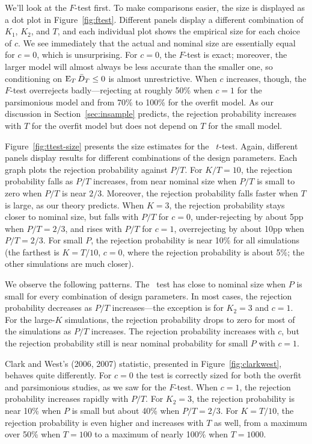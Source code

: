 \documentclass[11pt]{article}
\begin{document}
We'll look at the $F$-test first.  To make comparisons easier, the size
is displayed as a dot plot in Figure~\ref{fig:ftest}.  Different
panels display a different combination of $K_1$, $K_2$, and $T$, and
each individual plot shows the empirical size for each choice of $c$.
We see immediately that the actual and nominal size are essentially
equal for $c = 0$, which is unsurprising.  For $c = 0$, the $F$-test is
exact; moreover, the larger model will almost always be less accurate
than the smaller one, so conditioning on $\operatorname{E}_T \bar{D}_{T} \leq 0$ is
almost unrestrictive.  When $c$ increases, though, the $F$-test
overrejects badly---rejecting at roughly 50\% when $c = 1$ for the
parsimonious model and from 70\% to 100\% for the overfit model.  As
our discussion in Section~\ref{sec:insample} predicts, the rejection
probability increases with $T$ for the overfit model but does not
depend on $T$ for the small model.

Figure~\ref{fig:ttest-size} presents the size estimates for the \dmw\
$t$-test.  Again, different panels display results for different
combinations of the design parameters.  Each graph plots the rejection
probability against $P/T$.  For $K/T=10$, the rejection probability
falls as $P/T$ increases, from near nominal size when $P/T$ is small
to zero when $P/T$ is near $2/3$.  Moreover, the rejection probability
falls faster when $T$ is large, as our theory predicts.  When $K=3$,
the rejection probability stays closer to nominal size, but falls with
$P/T$ for $c=0$, under-rejecting by about 5pp when $P/T = 2/3$, and
rises with $P/T$ for $c=1$, overrejecting by about 10pp when
$P/T=2/3$.  For small $P$, the rejection probability is near 10\% for
all simulations (the farthest is $K=T/10$, $c=0$, where the rejection
probability is about 5\%; the other simulations are much closer).

We observe the following patterns.  The
\dmw\ test has close to nominal size when $P$ is small for every
combination of design parameters.  In most cases, the rejection
probability decreases as $P/T$ increases---the exception is for $K_2 =
3$ and $c=1$.  For the large-$K$ simulations, the rejection
probability drops to zero for most of the simulations as $P/T$
increases.  The rejection probability increases with $c$, but the
rejection probability still is near nominal probability for small $P$
with $c=1$.

Clark and West's (2006, 2007) statistic, presented in
Figure~\ref{fig:clarkwest}, behaves quite differently.  For $c=0$ the
test is correctly sized for both the overfit and parsimonious studies,
as we saw for the $F$-test.  When $c=1$, the rejection probability
increases rapidly with $P/T$.  For $K_2=3$, the rejection probability
is near 10\% when $P$ is small but about 40\% when $P/T = 2/3$.  For
$K=T/10$, the rejection probability is even higher and increases with
$T$ as well, from a maximum over 50\% when $T=100$ to a maximum of
nearly 100\% when $T=1000$.
\end{document}
